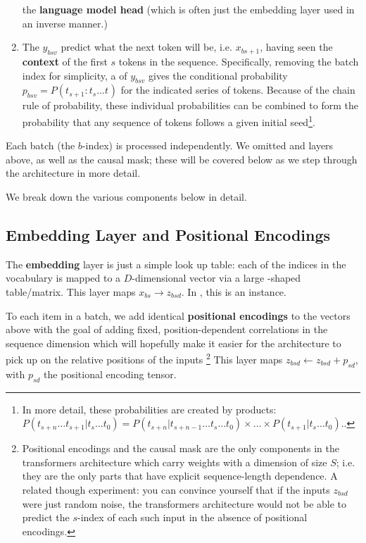 \documentclass[11pt]{article}
\begin{document}
\begin{enumerate}
	      the \textbf{language model head} (which is often just the embedding layer used in an inverse
	      manner.)
	\item  The $ y _{ bsv } $ predict what the next token will be, i.e. $ x _{ bs+1 } $, having seen the \textbf{context}
          of the first $ s $ tokens in the sequence. Specifically, removing the batch index for
          simplicity, a   of $ y _{ bsv } $ gives the conditional probability $ p _{ bsv
          } = P(t _{ s+1 }:t _{ s } \ldots t _ {}) $ for the indicated series of tokens. Because of
          the chain rule of probability, these individual probabilities can be combined to form the
          probability that any sequence of tokens follows a given initial seed\footnote{In more
          detail, these probabilities are created by products: $ P(t _{ s+n } \ldots t _{ s+1}| t _{
          s } \ldots  t _{ 0 }) =P(t _{ s+n }| t _{ s+n - 1} \ldots  t _{ s } \ldots  t _{ 0}) \times
      \ldots  \times P(t _{ s+1 } | t _{ s } \ldots  t _{ 0 }) $..}.
\end{enumerate}


Each batch (the $ b $-index) is processed independently. We omitted  and
 layers above, as well as the causal mask; these will be covered below as we step
through the architecture in more detail.


We break down the various components below in detail.

\subsection{Embedding Layer and Positional Encodings \label{subsubsec_embedding_and_pe} }

The \textbf{embedding} layer is just a simple look up table: each of the  indices
in the vocabulary is mapped to a $ D $-dimensional vector via a large -shaped
table/matrix. This layer maps $ x _{ bs } \longrightarrow z _{ bsd } $. In , this is
an  instance.

To each item in a batch, we add identical \textbf{positional encodings} to the vectors above with
the goal of adding fixed, position-dependent correlations in the sequence dimension which will
hopefully make it easier for the architecture to pick up on the relative positions of the inputs
\footnote{Positional encodings and the causal mask are the only components in the transformers
	architecture which carry weights with a dimension of size $ S $; i.e. they are the only parts that
	have explicit sequence-length dependence. A related though experiment: you can convince yourself
	that if the inputs $ z_{ bsd } $
	were just random noise, the transformers architecture would not be able to predict
	the $ s $-index of each such input in the absence of positional encodings. } This layer maps $ z _{
			bsd} \leftarrow z _{ bsd } + p _{ sd } $, with $ p _{ sd } $ the positional encoding tensor.
\end{document}
